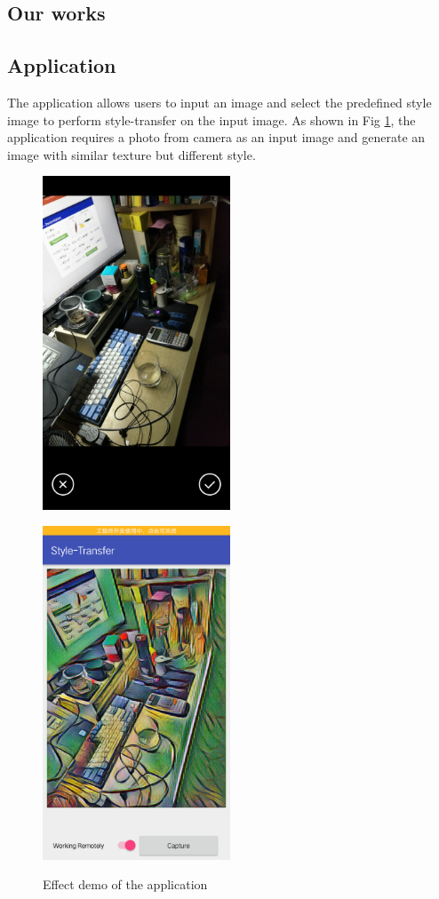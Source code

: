 \documentclass[a4paper,11pt,onecolumn,twoside]{article}
\begin{document}
\begin{CJK*}{GBK}{song}
\section{Our works}
\subsection{Application}
The application allows users to input an image and select the predefined
style image to perform style-transfer on the input image. 
As shown in Fig \ref{fig:transfer}, the application requires
a photo from camera as an input image and generate an image with
similar texture but different style.


\begin{figure}[!hbt]
  \begin{minipage}[t]{0.5\linewidth}
    \centering
    \includegraphics[width=2.2in]{origin}
    \label{fig:origin}
    \end{minipage}
    \begin{minipage}[t]{0.5\linewidth}
    \centering
    \includegraphics[width=2.2in]{transfer}
    \label{fig:transfer}
  \end{minipage}
  \caption{Effect demo of the application}
\end{figure}


\end{CJK*}
\end{document}
